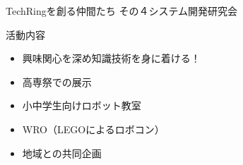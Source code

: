 \documentclass[dvipdfmx]{beamer}
\begin{document}
\begin{frame}{TechRingを創る仲間たち その４}{システム開発研究会}
  
  \vspace{-2mm}
  
  \begin{minipage}{0.85\textwidth}
    \begin{block}{活動内容}
      \begin{itemize}
        \item 興味関心を深め知識技術を身に着ける！
        \item 高専祭での展示
        \item 小中学生向けロボット教室
        \item WRO（LEGOによるロボコン）
        \item 地域との共同企画
      \end{itemize}
    \end{block}
  \end{minipage}


\end{frame}
\end{document}
